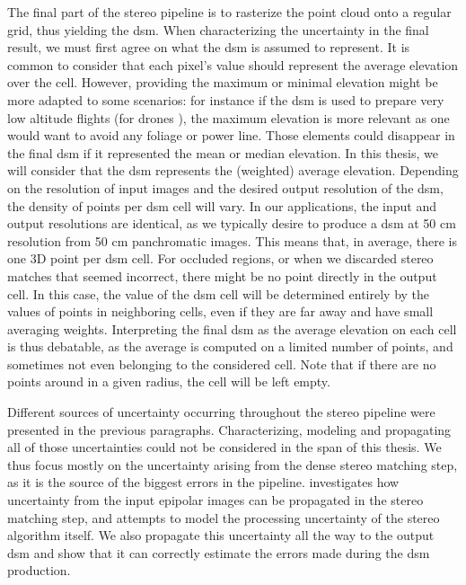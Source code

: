 The final part of the stereo pipeline is to rasterize the point cloud onto a regular grid, thus yielding the \acrshort{dsm}. When characterizing the uncertainty in the final result, we must first agree on what the \acrshort{dsm} is assumed to represent. It is common to consider that each pixel's value should represent the average elevation over the cell. However, providing the maximum or minimal elevation might be more adapted to some scenarios: for instance if the \acrshort{dsm} is used to prepare very low altitude flights (for drones \etc), the maximum elevation is more relevant as one would want to avoid any foliage or power line. Those elements could disappear in the final \acrshort{dsm} if it represented the mean or median elevation. In this thesis, we will consider that the \acrshort{dsm} represents the (weighted) average elevation. Depending on the resolution of input images and the desired output resolution of the \acrshort{dsm}, the density of points per \acrshort{dsm} cell will vary. In our applications, the input and output resolutions are identical, as we typically desire to produce a \acrshort{dsm} at 50 cm resolution from 50 cm panchromatic images. This means that, in average, there is one 3D point per \acrshort{dsm} cell. For occluded regions, or when we discarded stereo matches that seemed incorrect, there might be no point directly in the output cell. In this case, the value of the \acrshort{dsm} cell will be determined entirely by the values of points in neighboring cells, even if they are far away and have small averaging weights. Interpreting the final \acrshort{dsm} as the average elevation on each cell is thus debatable, as the average is computed on a limited number of points, and sometimes not even belonging to the considered cell. Note that if there are no points around in a given radius, the cell will be left empty. 

Different sources of uncertainty occurring throughout the stereo pipeline were presented in the previous paragraphs. Characterizing, modeling and propagating all of those uncertainties could not be considered in the span of this thesis. We thus focus mostly on the uncertainty arising from the dense stereo matching step, as it is the source of the biggest errors in the pipeline.  investigates how uncertainty from the input epipolar images can be propagated in the stereo matching step, and  attempts to model the processing uncertainty of the stereo algorithm itself. We also propagate this uncertainty all the way to the output \acrshort{dsm} and show that it can correctly estimate the errors made during the \acrshort{dsm} production.

